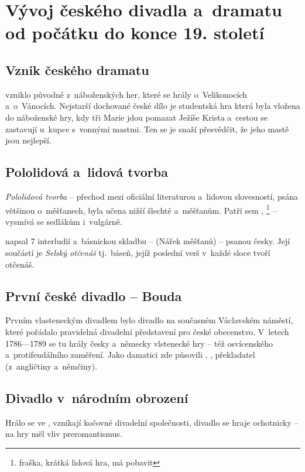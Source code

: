 \chapter[Vývoj českého divadla]{Vývoj českého divadla a~dramatu od počátku do konce 19. století}
\section{Vznik českého dramatu}
 vzniklo původně z~náboženských her, které se hrály
o~Velikonocích a~o~Vánocích. Nejstarší dochované české dílo je
studentská hra  která byla vložena do náboženské hry,
kdy tři Marie jdou pomazat Ježíše Krista a~cestou se zastavují u~kupce
s~vonnými mastmi. Ten se je snaží přesvědčit, že jeho mastě jsou
nejlepší.

\section{Pololidová a~lidová tvorba}
\emph{Pololidová tvorba} -- přechod mezi oficiální literaturou a~lidovou
slovesností, psána většinou o~měšťanech, byla učena nižší šlechtě
a~měšťanům. Patří sem , 
\footnote{fraška, krátká lidová hra, má pobavit}
-- vysmívá se sedlákům i~vulgárně.

 napsal 7 interludií a~básnickou skladbu --
 (Nářek měšťanů) -- psanou česky.
Její součástí je \emph{Selský otčenáš} tj.~báseň, jejíž poslední verš v~každé
sloce tvoří otčenáš.

\section{První české divadlo -- Bouda}
Prvním vlasteneckým divadlem bylo divadlo  na současném
Václavském náměstí, které pořádalo pravidelná divadelní představení pro
české obecenstvo. V~letech 1786---1789 se tu hrály česky a~německy
vlstenecké hry -- též osvícenského a~protifeudálního zaměření. Jako
damatici zde půsovili , ,
překladatel  (z~angličtiny a~němčiny).

\section{Divadlo v~národním obrození}
Hrálo se ve , vznikají
kočovné divadelní společnosti, divadlo se hraje ochotnicky -- na hry měl
vliv preromantismus.

